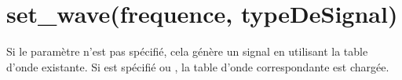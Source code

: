 \documentclass[a4paper,12pt,french]{sphinxmanual}
\begin{document}
\begin{sphinxVerbatim}[commandchars=\\\{\}]
   
 
   
\PYG{p}{[}\PYG{p}{]}\PYG{p}{[}\PYG{p}{]}        
\PYG{p}{[}\PYG{p}{]}\PYG{p}{[}\PYG{p}{]}        
\end{sphinxVerbatim}


\section{set\_wave(frequence, typeDeSignal)}
\label{\detokenize{9.0:set-wave-frequence-typedesignal}}
Si le paramètre  n’est pas spécifié, cela génère
un signal en utilisant la table d’onde existante. Si 
est spécifié  ou , la table d’onde
correspondante est chargée.
\end{document}
